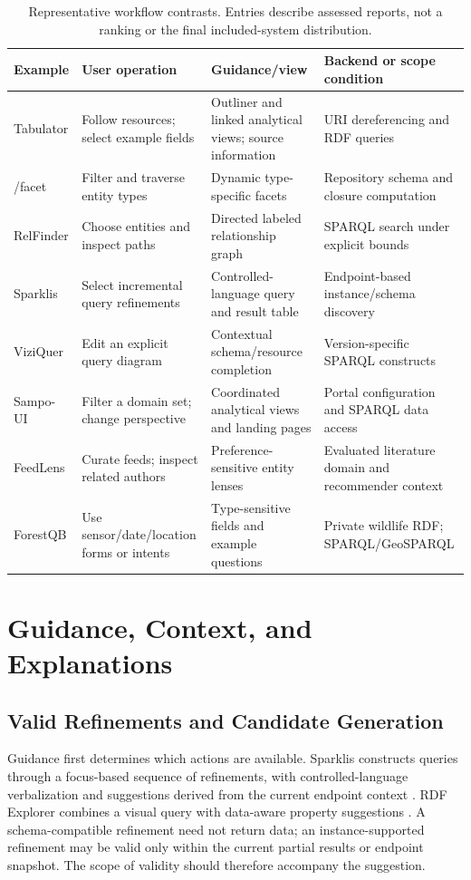 \documentclass[manuscript,review,screen]{acmart}
\begin{document}
\begin{table}[htbp]
\centering\small
\caption{Representative workflow contrasts. Entries describe assessed reports, not a ranking or the final included-system distribution.}
\label{tab:workflows}
\begin{tabularx}{\linewidth}{L{24mm} Y Y Y}
\toprule Example & User operation & Guidance/view & Backend or scope condition\\\midrule
Tabulator & Follow resources; select example fields & Outliner and linked analytical views; source information & URI dereferencing and RDF queries\\
/facet & Filter and traverse entity types & Dynamic type-specific facets & Repository schema and closure computation\\
RelFinder & Choose entities and inspect paths & Directed labeled relationship graph & SPARQL search under explicit bounds\\
Sparklis & Select incremental query refinements & Controlled-language query and result table & Endpoint-based instance/schema discovery\\
ViziQuer & Edit an explicit query diagram & Contextual schema/resource completion & Version-specific SPARQL constructs\\
Sampo-UI & Filter a domain set; change perspective & Coordinated analytical views and landing pages & Portal configuration and SPARQL data access\\
FeedLens & Curate feeds; inspect related authors & Preference-sensitive entity lenses & Evaluated literature domain and recommender context\\
ForestQB & Use sensor/date/location forms or intents & Type-sensitive fields and example questions & Private wildlife RDF; SPARQL/GeoSPARQL\\\bottomrule
\end{tabularx}
\end{table}

\section{Guidance, Context, and Explanations}
\subsection{Valid Refinements and Candidate Generation}
Guidance first determines which actions are available. Sparklis constructs queries through a focus-based sequence of refinements, with controlled-language verbalization and suggestions derived from the current endpoint context \citep{2017_Ferre_Sparklis_An}. RDF Explorer combines a visual query with data-aware property suggestions \citep{2019_Vargas_RDF_Explorer}. A schema-compatible refinement need not return data; an instance-supported refinement may be valid only within the current partial results or endpoint snapshot. The scope of validity should therefore accompany the suggestion.
\end{document}
